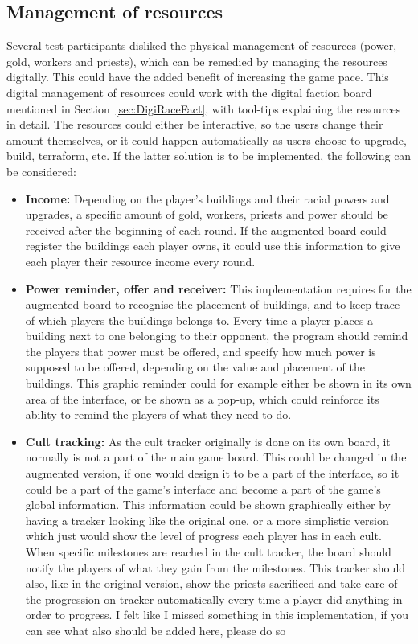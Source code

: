 \subsection{Management of resources}
Several test participants disliked the physical management of resources (power, gold, workers and priests), which can be remedied by managing the resources digitally. This could have the added benefit of increasing the game pace. This digital management of resources could work with the digital faction board mentioned in Section~\ref{sec:DigiRaceFact}, with tool-tips explaining the resources in detail. The resources could either be interactive, so the users change their amount themselves, or it could happen automatically as users choose to upgrade, build, terraform, etc. If the latter solution is to be implemented, the following can be considered:
\begin{itemize}
\item \textbf{Income:} Depending on the player's buildings and their racial powers and upgrades, a specific amount of gold, workers, priests and power should be received after the beginning of each round. If the augmented board could register the buildings each player owns, it could use this information to give each player their resource income every round. 
\item \textbf{Power reminder, offer and receiver:} This implementation requires for the augmented board to recognise the placement of buildings, and to keep trace of which players the buildings belongs to. Every time a player places a building next to one belonging to their opponent, the program should remind the players that power must be offered, and specify how much power is supposed to be offered, depending on the value and placement of the buildings. This graphic reminder could for example either be shown in its own area of the interface, or be shown as a pop-up, which could reinforce its ability to remind the players of what they need to do.
\item \textbf{Cult tracking:} As the cult tracker originally is done on its own board, it normally is not a part of the main game board. This could be changed in the augmented version, if one would design it to be a part of the interface, so it could be a part of the game's interface and become a part of the game's global information. This information could be shown graphically either by having a tracker looking like the original one, or a more simplistic version which just would show the level of progress each player has in each cult. When specific milestones are reached in the cult tracker, the board should notify the players of what they gain from the milestones. This tracker should also, like in the original version, show the priests sacrificed and take care of the progression on tracker automatically every time a player did anything in order to progress. {I felt like I missed something in this implementation, if you can see what also should be added here, please do so}
\end{itemize}

